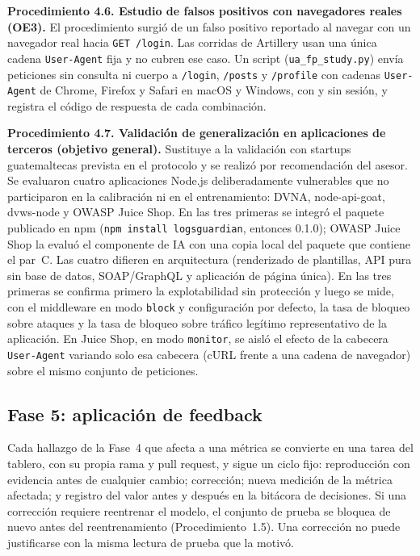\textbf{Procedimiento 4.6. Estudio de falsos positivos con navegadores reales (OE3).} El
procedimiento surgió de un falso positivo reportado al navegar con un navegador real hacia
\texttt{GET /login}. Las corridas de Artillery usan una única cadena \texttt{User-Agent} fija y no
cubren ese caso. Un script (\texttt{ua\_fp\_study.py}) envía peticiones sin consulta ni cuerpo a
\texttt{/login}, \texttt{/posts} y \texttt{/profile} con cadenas \texttt{User-Agent} de Chrome,
Firefox y Safari en macOS y Windows, con y sin sesión, y registra el código de respuesta de cada
combinación.

\textbf{Procedimiento 4.7. Validación de generalización en aplicaciones de terceros (objetivo
general).} Sustituye a la validación con startups guatemaltecas prevista en el protocolo y se
realizó por recomendación del asesor. Se evaluaron cuatro aplicaciones Node.js deliberadamente vulnerables que no participaron en la
calibración ni en el entrenamiento: DVNA, node-api-goat, dvws-node y OWASP Juice Shop. En las tres
primeras se integró el paquete publicado en npm (\texttt{npm install logsguardian}, entonces 0.1.0);
OWASP Juice Shop la evaluó el componente de IA con una copia local del paquete que contiene el
par~C. Las cuatro difieren en arquitectura (renderizado de
plantillas, API pura sin base de datos, SOAP/GraphQL y aplicación de página única). En las tres primeras se confirma primero la explotabilidad sin protección y luego se mide, con el
middleware en modo \texttt{block} y configuración por defecto, la tasa de bloqueo sobre ataques y la tasa de bloqueo
sobre tráfico legítimo representativo de la aplicación. En Juice Shop, en modo \texttt{monitor},
se aisló el efecto de la cabecera \texttt{User-Agent} variando solo esa cabecera (cURL frente a
una cadena de navegador) sobre el mismo conjunto de peticiones.

\subsection{Fase 5: aplicación de feedback}
\label{subsec:met-f5}
Cada hallazgo de la Fase~4 que afecta a una métrica se convierte en una tarea del tablero, con
su propia rama y pull request, y sigue un ciclo fijo: reproducción con evidencia antes de
cualquier cambio; corrección; nueva medición de la métrica afectada; y registro del valor antes
y después en la bitácora de decisiones. Si una corrección requiere reentrenar el modelo, el
conjunto de prueba se bloquea de nuevo antes del reentrenamiento (Procedimiento~1.5). Una
corrección no puede justificarse con la misma lectura de prueba que la motivó.

